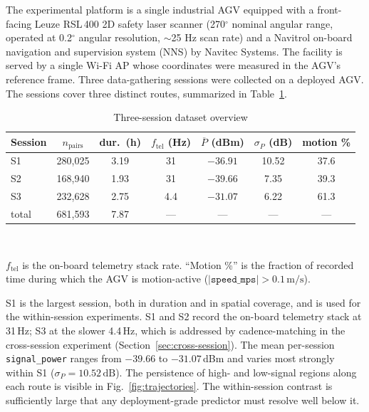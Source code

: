 \documentclass[conference]{IEEEtran}
\newcommand{\dB}{\,\mathrm{dB}}
\begin{document}
The experimental platform is a single industrial AGV equipped with a front-facing Leuze RSL\,400 2D safety laser scanner (270$^{\circ}$ nominal angular range, operated at 0.2$^{\circ}$ angular resolution, $\sim$25 Hz scan rate) and a Navitrol on-board navigation and supervision system (NNS) by Navitec Systems. The facility is served by a single Wi\nobreakdash-Fi AP whose coordinates were measured in the AGV's reference frame.
Three data-gathering sessions were collected on a deployed AGV. The sessions cover three distinct routes, summarized in Table~\ref{tab:sessions}. 

\begin{table}[!htbp]
    \caption{Three-session dataset overview}
    \label{tab:sessions}
    \centering
    \renewcommand{\arraystretch}{1.0}
    \setlength{\tabcolsep}{4pt}
    \footnotesize
    \begin{tabular}{l c c c c c c}
        \toprule
        Session & $n_{\text{pairs}}$ & dur.\ (h) & $f_{\text{tel}}$ (Hz) & $\overline{P}$ (dBm) & $\sigma_P$ (dB) & motion \% \\
        \midrule
        S1    & 280{,}025 & 3.19 & 31  & $-36.91$ & 10.52 & 37.6 \\
        S2    & 168{,}940 & 1.93 & 31  & $-39.66$ & 7.35  & 39.3 \\
        S3    & 232{,}628 & 2.75 & 4.4 & $-31.07$ & 6.22  & 61.3 \\
        \midrule
        total & 681{,}593 & 7.87 & --- & --- & --- & --- \\
        \bottomrule
    \end{tabular}
    \\[3pt]
    \raggedright
    \footnotesize
    $f_{\text{tel}}$ is the on-board telemetry stack rate. ``Motion \%'' is the fraction of recorded time during which the AGV is motion-active ($|\texttt{speed\_mps}| > 0.1\,\mathrm{m/s}$).
\end{table}

S1 is the largest session, both in duration and in spatial coverage, and is used for the within-session experiments. S1 and S2 record the on-board telemetry stack at 31\,Hz; S3 at the slower 4.4\,Hz, which is addressed by cadence-matching in the cross-session experiment (Section~\ref{sec:cross-session}).
The mean per-session \texttt{signal\_power} ranges from $-39.66$ to $-31.07$\,dBm and varies most strongly within S1 ($\sigma_P = 10.52\dB$).
The persistence of high- and low-signal regions along each route is visible in Fig.~\ref{fig:trajectories}. The within-session contrast is sufficiently large that any deployment-grade predictor must resolve well below it.
\end{document}
